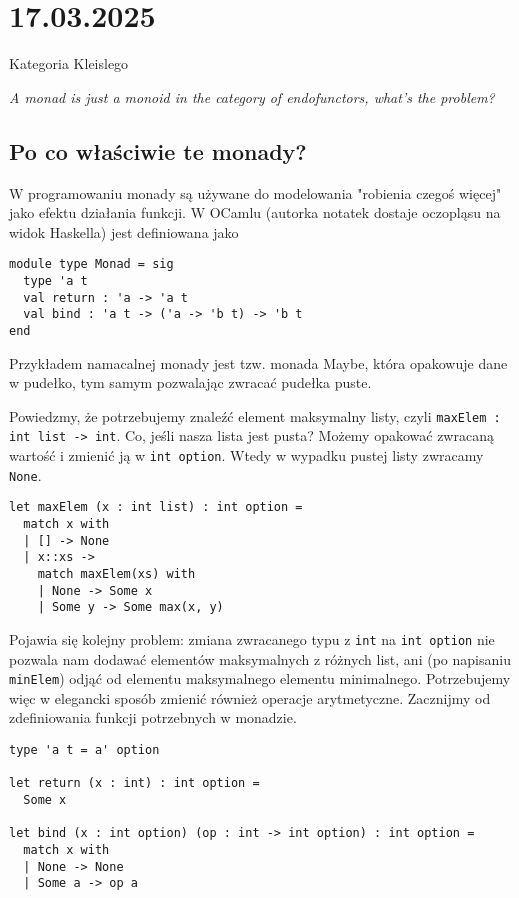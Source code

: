 \section{17.03.2025}{Kategoria Kleislego}

\begin{adjustwidth}{200pt}{0pt}
\begin{flushright}\slshape
  A monad is just a monoid in the category of endofunctors, what's the problem?
\end{flushright}
\end{adjustwidth}

\subsection{Po co właściwie te monady?}

W programowaniu monady są używane do modelowania "robienia czegoś więcej" jako efektu działania funkcji. W OCamlu (autorka notatek dostaje oczopląsu na widok Haskella) jest definiowana jako

\begin{lstlisting}
module type Monad = sig
  type 'a t
  val return : 'a -> 'a t
  val bind : 'a t -> ('a -> 'b t) -> 'b t
end
\end{lstlisting}
Przykładem namacalnej monady jest tzw. monada Maybe, która opakowuje dane w pudełko, tym samym pozwalając zwracać pudełka puste. 

Powiedzmy, że potrzebujemy znaleźć element maksymalny listy, czyli \lstinline{maxElem : int list -> int}. Co, jeśli nasza lista jest pusta? Możemy opakować zwracaną wartość i zmienić ją w \lstinline{int option}. Wtedy w wypadku pustej listy zwracamy \lstinline{None}. 

\begin{lstlisting}
let maxElem (x : int list) : int option = 
  match x with 
  | [] -> None 
  | x::xs -> 
    match maxElem(xs) with 
    | None -> Some x
    | Some y -> Some max(x, y)
\end{lstlisting}

Pojawia się kolejny problem: zmiana zwracanego typu z \lstinline{int} na \lstinline{int option} nie pozwala nam dodawać elementów maksymalnych z różnych list, ani (po napisaniu \lstinline{minElem}) odjąć od elementu maksymalnego elementu minimalnego. Potrzebujemy więc w elegancki sposób zmienić również operacje arytmetyczne. Zacznijmy od zdefiniowania funkcji potrzebnych w monadzie.

\begin{lstlisting}
type 'a t = a' option

let return (x : int) : int option = 
  Some x

let bind (x : int option) (op : int -> int option) : int option = 
  match x with 
  | None -> None
  | Some a -> op a
\end{lstlisting}

